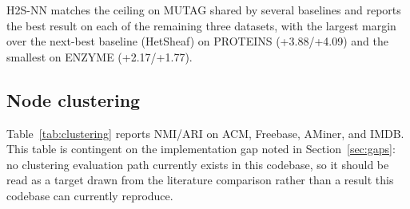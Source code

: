 \documentclass{article}
\begin{document}
H2S-NN matches the ceiling on MUTAG shared by several baselines and reports the best result on each
of the remaining three datasets, with the largest margin over the next-best baseline (HetSheaf) on
PROTEINS (+3.88/+4.09) and the smallest on ENZYME (+2.17/+1.77).

\subsection{Node clustering}

Table~\ref{tab:clustering} reports NMI/ARI on ACM, Freebase, AMiner, and IMDB. This table is
contingent on the implementation gap noted in Section~\ref{sec:gaps}: no clustering evaluation path
currently exists in this codebase, so it should be read as a target drawn from the literature
comparison rather than a result this codebase can currently reproduce.

\begin{table}[h]
  \centering
  \caption{Node clustering: NMI / ARI. Bold denotes best.}
  \label{tab:clustering}
  \small
\end{table}
\end{document}
